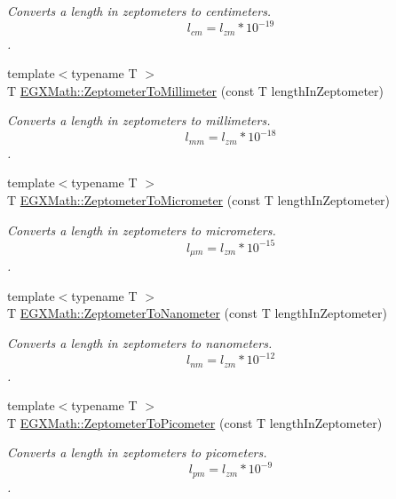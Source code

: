 \begin{DoxyCompactItemize}
\begin{DoxyCompactList}\small\item\em Converts a length in zeptometers to centimeters. \[ l_{cm}=l_{zm} * 10^{-19} \]. \end{DoxyCompactList}\item 
{\footnotesize template$<$typename T $>$ }\\T \mbox{\hyperlink{group___e_g_x_math-_conversions-_length_conversions-_s_i-_zeptometer-_s_i_ga5caeffbc654c4bfc6390ed822cee42a5}{E\+G\+X\+Math\+::\+Zeptometer\+To\+Millimeter}} (const T length\+In\+Zeptometer)
\begin{DoxyCompactList}\small\item\em Converts a length in zeptometers to millimeters. \[ l_{mm}=l_{zm} * 10^{-18} \]. \end{DoxyCompactList}\item 
{\footnotesize template$<$typename T $>$ }\\T \mbox{\hyperlink{group___e_g_x_math-_conversions-_length_conversions-_s_i-_zeptometer-_s_i_ga3ff7c51338abdb80d18becf7245a32fd}{E\+G\+X\+Math\+::\+Zeptometer\+To\+Micrometer}} (const T length\+In\+Zeptometer)
\begin{DoxyCompactList}\small\item\em Converts a length in zeptometers to micrometers. \[ l_{\mu m}=l_{zm} * 10^{-15} \]. \end{DoxyCompactList}\item 
{\footnotesize template$<$typename T $>$ }\\T \mbox{\hyperlink{group___e_g_x_math-_conversions-_length_conversions-_s_i-_zeptometer-_s_i_ga0a9d1243a7723cac27aeb6ed48acc3e8}{E\+G\+X\+Math\+::\+Zeptometer\+To\+Nanometer}} (const T length\+In\+Zeptometer)
\begin{DoxyCompactList}\small\item\em Converts a length in zeptometers to nanometers. \[ l_{nm}=l_{zm} * 10^{-12} \]. \end{DoxyCompactList}\item 
{\footnotesize template$<$typename T $>$ }\\T \mbox{\hyperlink{group___e_g_x_math-_conversions-_length_conversions-_s_i-_zeptometer-_s_i_gae7409493227692a85b7fa5016a007de3}{E\+G\+X\+Math\+::\+Zeptometer\+To\+Picometer}} (const T length\+In\+Zeptometer)
\begin{DoxyCompactList}\small\item\em Converts a length in zeptometers to picometers. \[ l_{pm}=l_{zm} * 10^{-9} \]. \end{DoxyCompactList}\item 

\end{DoxyCompactItemize}
